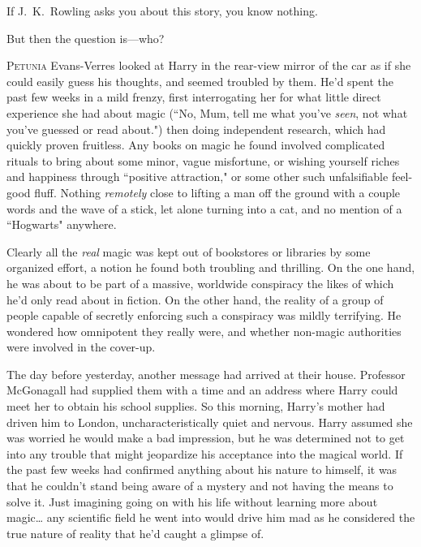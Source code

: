 
\begin{chapterOpeningAuthorNote}
If J.~K.~Rowling asks you about this story, you know nothing.
\end{chapterOpeningAuthorNote}
\begin{chapterOpeningQuote}
But then the question is—who?
\end{chapterOpeningQuote}

\lettrine{P}{etunia} Evans-Verres looked at Harry in the rear-view mirror of the car as if she could easily guess his thoughts, and seemed troubled by them. He'd spent the past few weeks in a mild frenzy, first interrogating her for what little direct experience she had about magic (``No, Mum, tell me what you've \emph{seen}, not what you've guessed or read about.") then doing independent research, which had quickly proven fruitless. Any books on magic he found involved complicated rituals to bring about some minor, vague misfortune, or wishing yourself riches and happiness through ``positive attraction," or some other such unfalsifiable feel-good fluff. Nothing \emph{remotely} close to lifting a man off the ground with a couple words and the wave of a stick, let alone turning into a cat, and no mention of a ``Hogwarts" anywhere.

Clearly all the \emph{real} magic was kept out of bookstores or libraries by some organized effort, a notion he found both troubling and thrilling. On the one hand, he was about to be part of a massive, worldwide conspiracy the likes of which he'd only read about in fiction. On the other hand, the reality of a group of people capable of secretly enforcing such a conspiracy was mildly terrifying. He wondered how omnipotent they really were, and whether non-magic authorities were involved in the cover-up.

The day before yesterday, another message had arrived at their house. Professor McGonagall had supplied them with a time and an address where Harry could meet her to obtain his school supplies. So this morning, Harry's mother had driven him to London, uncharacteristically quiet and nervous. Harry assumed she was worried he would make a bad impression, but he was determined not to get into any trouble that might jeopardize his acceptance into the magical world. If the past few weeks had confirmed anything about his nature to himself, it was that he couldn't stand being aware of a mystery and not having the means to solve it. Just imagining going on with his life without learning more about magic{\ldots} any scientific field he went into would drive him mad as he considered the true nature of reality that he'd caught a glimpse of.

